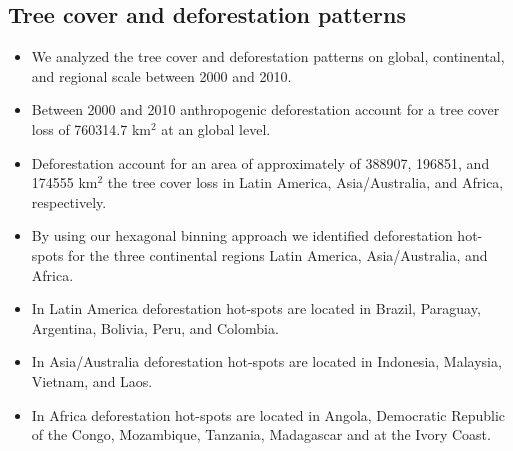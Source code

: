 		\subsection{Tree cover and deforestation patterns}
		\label{subsec:discussion_tree_cover_and_deforestation}
			\begin{itemize}
				\item We analyzed the tree cover and deforestation patterns on global, continental, and regional scale between 2000 and 2010.
				\item Between 2000 and 2010 anthropogenic deforestation account for a tree cover loss of 760314.7 km$^2$ at an global level.
				\item Deforestation account for an area of approximately of 388907, 196851, and 174555 km$^2$ the tree cover loss in Latin America, Asia/Australia, and Africa, respectively.
				\item By using our hexagonal binning approach we identified deforestation hot-spots for the three continental regions Latin America, Asia/Australia, and Africa.
				\item In Latin America deforestation hot-spots are located in Brazil, Paraguay, Argentina, Bolivia, Peru, and Colombia.
				\item In Asia/Australia deforestation hot-spots are located in Indonesia, Malaysia, Vietnam, and Laos.
				\item In Africa deforestation hot-spots are located in Angola, Democratic Republic of the Congo, Mozambique, Tanzania, Madagascar and at the Ivory Coast.
			\end{itemize}

